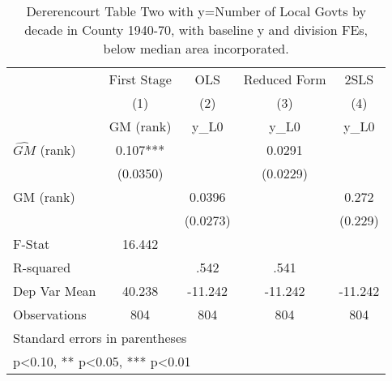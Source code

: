 \begin{table}[htbp]\centering
\def\sym#1{\ifmmode^{#1}\else\(^{#1}\)\fi}
\caption{Dererencourt Table Two with y=Number of Local Govts by decade in County 1940-70, with baseline y and division FEs, below median area incorporated.}
\begin{tabular}{l*{4}{c}}
\toprule
                    & First Stage   &         OLS   &Reduced Form   &        2SLS   \\
                    &\multicolumn{1}{c}{(1)}&\multicolumn{1}{c}{(2)}&\multicolumn{1}{c}{(3)}&\multicolumn{1}{c}{(4)}\\
                    &\multicolumn{1}{c}{GM  (rank)}&\multicolumn{1}{c}{y\_L0}&\multicolumn{1}{c}{y\_L0}&\multicolumn{1}{c}{y\_L0}\\
\midrule
$\hat{GM}$ (rank)   &       0.107***&               &      0.0291   &               \\
                    &    (0.0350)   &               &    (0.0229)   &               \\
\addlinespace
GM  (rank)          &               &      0.0396   &               &       0.272   \\
                    &               &    (0.0273)   &               &     (0.229)   \\
\midrule
F-Stat              &      16.442   &               &               &               \\
R-squared           &               &        .542   &        .541   &               \\
Dep Var Mean        &      40.238   &     -11.242   &     -11.242   &     -11.242   \\
Observations        &         804   &         804   &         804   &         804   \\
\bottomrule
\multicolumn{5}{l}{\footnotesize Standard errors in parentheses}\\
\multicolumn{5}{l}{\footnotesize * p<0.10, ** p<0.05, *** p<0.01}\\
\end{tabular}
\end{table}
